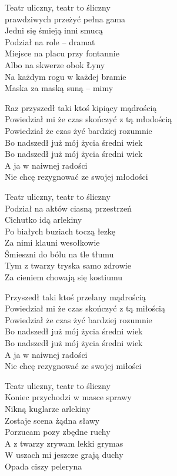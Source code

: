 \begin{text}
    \begin{footTwelve}
    Teatr uliczny, teatr to śliczny\\
    prawdziwych przeżyć pełna gama\\
    Jedni się śmieją inni smucą\\
    Podział na role – dramat\\
    Miejsce na placu przy fontannie\\
    Albo na skwerze obok Łyny\\
    Na każdym rogu w każdej bramie\\
    Maska za maską suną – mimy

    Raz przyszedł taki ktoś kipiący mądrością\\
    Powiedział mi że czas skończyć z tą młodością\\
    Powiedział że czas żyć bardziej rozumnie\\
    Bo nadszedł już mój życia średni wiek\\
    Bo nadszedł już mój życia średni wiek\\
    A ja w naiwnej radości\\
    Nie chcę rezygnować ze swojej młodości

    Teatr uliczny, teatr to śliczny\\
    Podział na aktów ciasną przestrzeń\\
    Cichutko idą arlekiny\\
    Po białych buziach toczą łezkę\\
    Za nimi klauni wesołkowie\\
    Śmieszni do bólu na tle tłumu\\
    Tym z twarzy tryska samo zdrowie\\
    Za cieniem chowają się kostiumu

    Przyszedł taki ktoś przelany mądrością\\
    Powiedział mi że czas skończyć z tą miłością\\
    Powiedział że czas żyć bardziej rozumnie\\
    Bo nadszedł już mój życia średni wiek\\
    Bo nadszedł już mój życia średni wiek\\
    A ja w naiwnej radości\\
    Nie chcę rezygnować ze swojej miłości

    Teatr uliczny, teatr to śliczny\\
    Koniec przychodzi w masce sprawy\\
    Nikną kuglarze arlekiny\\
    Zostaje scena żądna sławy\\
    Porzucam pozy zbędne ruchy\\
    A z twarzy zrywam lekki grymas\\
    W uszach mi jeszcze grają duchy\\
    Opada ciszy peleryna


\end{footTwelve}
\end{text}
